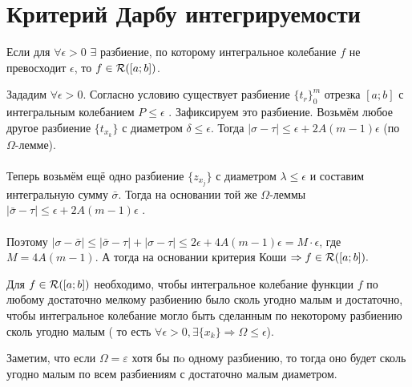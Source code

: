 \section{Критерий Дарбу интегрируемости}
\begin{theorem}
	Если для $\forall \epsilon > 0$ $\exists$ разбиение, по которому интегральное колебание $f$ не превосходит $\epsilon$, то $f \in\mathcal{R}([a; b])$.
\end{theorem}
\begin{Proof}
	Зададим $\forall \epsilon > 0$. Согласно условию существует разбиение $\{t_r\}_0^m$ отрезка $[a;b]$ с интегральным колебанием $P \le \epsilon$ . Зафиксируем это разбиение. Возьмём любое другое разбиение $\{t_{x_k}\}$ с диаметром $\delta \le \epsilon$. Тогда $|\sigma - \tau| \le \epsilon + 2A(m - 1)\epsilon$ (по $\Omega$-лемме).\\\\
	Теперь возьмём ещё одно разбиение $\{z_{x_j}\}$ с диаметром $\lambda \le \epsilon$ и составим интегральную сумму $\bar \sigma$. Тогда на основании той же $\Omega$-леммы $|\bar \sigma - \tau| \le \epsilon + 2A(m - 1)\epsilon$ .\\\\
	Поэтому $|\sigma -\bar \sigma| \le |\bar \sigma - \tau| + |\sigma - \tau| \le 2\epsilon + 4A(m - 1)\epsilon = M \cdot \epsilon$, где $M = 4A(m - 1)$. А тогда на основании критерия Коши $ \Rightarrow f \in\mathcal{R}([a; b]).$
\end{Proof}
\begin{theorem}
	Для $f \in\mathcal{R}([a; b])$ необходимо, чтобы интегральное колебание функции $f$ по любому достаточно мелкому  разбиению было сколь угодно малым и достаточно, чтобы интегральное колебание могло быть сделанным по некоторому разбиению сколь угодно малым ( то есть $\forall \epsilon > 0, \exists \{x_k\} \Rightarrow \Omega \le \epsilon$).
\end{theorem}
Заметим, что если $\Omega = \varepsilon$ хотя бы пo одному разбиению, то тогда оно будет сколь угодно малым по всем разбиениям с достаточно малым диаметром.
